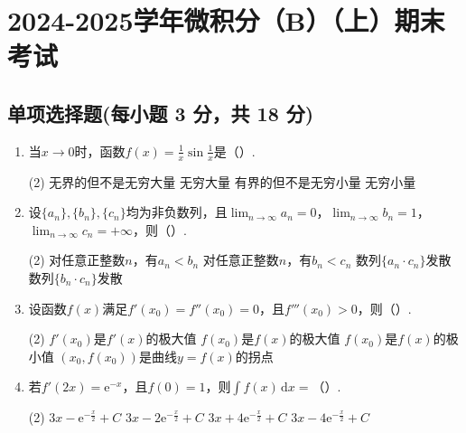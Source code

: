 \documentclass[../main.tex]{subfiles}
\begin{document}
\chapter{2024-2025学年微积分（B）（上）期末考试}

\section{单项选择题(每小题 3 分，共 18 分)}
\begin{enumerate}
    \item 当$x\to0$时，函数$f(x)=\frac{1}{x}\sin\frac{1}{x}$是（\qquad）.

          \begin{tasks}[label=\textbf{\Alph*.}, label-width=1.5em, column-sep=1em](2)
              \task 无界的但不是无穷大量
              \task 无穷大量
              \task 有界的但不是无穷小量
              \task 无穷小量
          \end{tasks}

    \item 设$\{a_{n}\},\{b_{n}\},\{c_{n}\}$均为非负数列，且$\lim_{n\to\infty}a_{n}
              =0$，$\lim_{n\to\infty}b_{n}=1$，$\lim_{n\to\infty}c_{n}=+\infty$，则（\qquad）.

          \begin{tasks}[label=\textbf{\Alph*.}, label-width=1.5em, column-sep=1em](2)
              \task 对任意正整数$n$，有$a_{n}<b_{n}$
              \task 对任意正整数$n$，有$b_{n}<c_{n}$
              \task 数列$\{a_{n}\cdot c_{n}\}$发散
              \task 数列$\{b_{n}\cdot c_{n}\}$发散
          \end{tasks}

    \item 设函数$f(x)$满足$f'(x_{0})=f''(x_{0})=0$，且$f'''(x_{0})>0$，则（\qquad）.

          \begin{tasks}[label=\textbf{\Alph*.}, label-width=1.5em, column-sep=1em](2)
              \task $f'(x_{0})$是$f'(x)$的极大值
              \task $f(x_{0})$是$f(x)$的极大值
              \task $f(x_{0})$是$f(x)$的极小值
              \task $(x_{0},f(x_{0}))$是曲线$y=f(x)$的拐点
          \end{tasks}

    \item 若$f'(2x)=\mathrm{e}^{-x}$，且$f(0)=1$，则$\int f(x)\,\mathrm{d}x=$（\qquad）.

          \begin{tasks}[label=\textbf{\Alph*.}, label-width=1.5em, column-sep=1em](2)
              \task $3x-\mathrm{e}^{-\frac{x}{2}}+C$
              \task $3x-2\mathrm{e}^{-\frac{x}{2}}+C$
              \task $3x+4\mathrm{e}^{-\frac{x}{2}}+C$
              \task $3x-4\mathrm{e}^{-\frac{x}{2}}+C$
          \end{tasks}


\end{enumerate}
\end{document}
